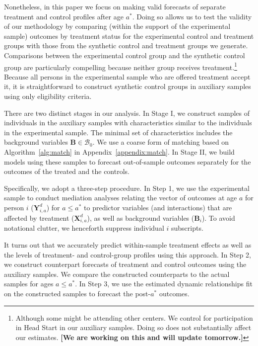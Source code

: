 Nonetheless, in this paper we focus on making valid forecasts of separate treatment and control profiles after age $a^*$. Doing so allows us to test the validity of our methodology by comparing (within the support of the experimental sample) outcomes by treatment status for the experimental control and treatment groups with those from the synthetic control and treatment groups we generate. Comparisons between the experimental control group and the synthetic control group are particularly compelling because neither group receives treatment.\footnote{Although some might be attending other centers. We control for participation in Head Start in our auxiliary samples. Doing so does not substantially affect our estimates. \textbf{[We are working on this and will update tomorrow.]}} Because all persons in the experimental sample who are offered treatment accept it, it is straightforward to construct synthetic control groups in auxiliary samples using only eligibility criteria.

There are two distinct stages in our analysis. In Stage I, we construct samples of individuals in the auxiliary samples with characteristics similar to the individuals in the experimental sample. The minimal set of characteristics includes the background variables $\bm{B} \in \mathcal{B}_0$. We use a coarse form of matching based on Algorithm~\ref{alg:match} in  Appendix~\ref{appendix:match}. In Stage II, we build models using these samples to forecast out-of-sample outcomes separately for the outcomes of the treated and the controls.

Specifically, we adopt a three-step procedure. In Step 1, we use the experimental sample to conduct mediation analyses relating the vector of outcomes at age $a$ for person $i$ ($\bm{Y}^{d}_{i,a}$) for $a\leq a^*$ to predictor variables (and interactions) that are affected by treatment ($\bm{X}^{d}_{i,a}$), as well as background variables ($\bm{B}_i$). To avoid notational clutter, we henceforth suppress individual $i$ subscripts.

It turns out that we accurately predict within-sample treatment effects as well as the levels of treatment- and control-group profiles using this approach. In Step 2, we construct counterpart forecasts of treatment and control outcomes using the auxiliary samples. We compare the constructed counterparts to the actual samples for ages $a \leq a^\ast$. In Step 3, we use the estimated dynamic relationships fit on the constructed samples to forecast the post-$a^{\ast}$ outcomes.

